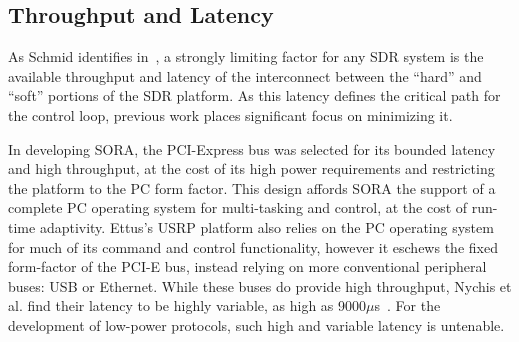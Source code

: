 \subsection{Throughput and Latency}
\label{sec:related-throughput}
As Schmid identifies in~\cite{schmid-latency}, a strongly limiting
factor for any SDR system is the available throughput and latency of
the interconnect between the ``hard'' and ``soft'' portions of the SDR
platform. As this latency defines the critical path for the control
loop, previous work places significant focus on minimizing it.

In developing SORA, the PCI-Express bus was selected for its bounded
latency and high throughput, at the cost
of its high power requirements and restricting the platform to the PC
form factor. This design affords SORA the support of a complete PC
operating system for multi-tasking and control, at the cost of
run-time adaptivity.
%
Ettus's USRP platform also relies on the PC operating system for much
of its command and control functionality, however it eschews the fixed
form-factor of the PCI-E bus, instead relying on more conventional
peripheral buses: USB or Ethernet. While these
buses do provide high throughput, Nychis et al. find their
latency to be highly variable, as high as
9000$\mu$s~\cite{cmu-mac-sdr}. For the development of low-power
protocols, such high and variable latency is untenable.

